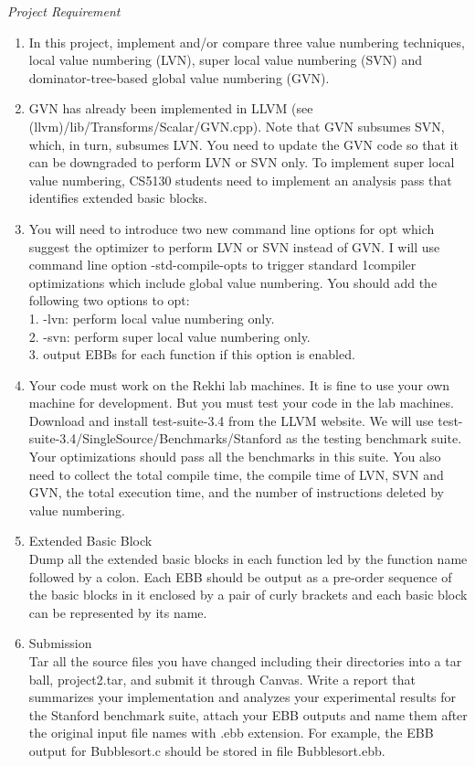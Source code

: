 \documentclass[11pt, a4paper, oneside]{Thesis}
\begin{document}
\textit{Project Requirement}

\begin{enumerate}
\item 
In this project, implement and/or compare three value numbering techniques, local value numbering
(LVN), super local value numbering (SVN) and dominator-tree-based global value numbering (GVN).
\item GVN has already been implemented in LLVM (see (llvm)/lib/Transforms/Scalar/GVN.cpp).
Note that GVN subsumes SVN, which, in turn, subsumes LVN. You need to update the GVN code so that
it can be downgraded to perform LVN or SVN only. To implement super local value numbering, CS5130
students need to implement an analysis pass that identifies extended basic blocks.
\item You will need to introduce two new command line options for opt which suggest the optimizer to perform
LVN or SVN instead of GVN. I will use command line option -std-compile-opts to trigger standard
1compiler optimizations which include global value numbering. You should add the following two options
to opt:
\\1. -lvn: perform local value numbering only.
\\2. -svn: perform super local value numbering only.
\\3. output EBBs for each function if this option is enabled.
\\
\item Your code must work on the Rekhi lab machines. It is fine to use your own machine for development. But
you must test your code in the lab machines.\\
Download and install test-suite-3.4 from the LLVM website. We will use
test-suite-3.4/SingleSource/Benchmarks/Stanford as the testing benchmark suite. Your
optimizations should pass all the benchmarks in this suite. You also need to collect the total compile time,
the compile time of LVN, SVN and GVN, the total execution time, and the number of instructions deleted
by value numbering.
\item 
Extended Basic Block \\
Dump all the extended basic blocks in each function led by the function name followed by a colon. Each
EBB should be output as a pre-order sequence of the basic blocks in it enclosed by a pair of curly brackets
and each basic block can be represented by its name.
\item
Submission\\
Tar all the source files you have changed including their directories into a tar ball, project2.tar, and submit
it through Canvas. Write a report that summarizes your implementation and analyzes your experimental
results for the Stanford benchmark suite, attach your EBB outputs and name them after the original input file names
with .ebb extension. For example, the EBB output for Bubblesort.c should be stored in file Bubblesort.ebb. 
\end{enumerate}
\end{document}
